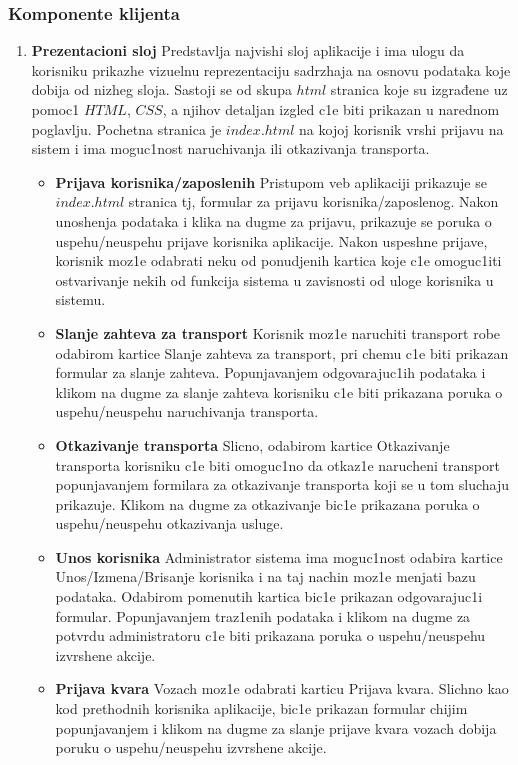 \subsubsection{Komponente klijenta}
\begin{enumerate}
    \item \textbf{Prezentacioni sloj}
    Predstavlja najvishi sloj aplikacije i ima ulogu da korisniku
prikazhe vizuelnu reprezentaciju sadrzhaja na osnovu podataka koje dobija od nizheg
sloja. Sastoji se od skupa $html$ stranica koje su izgrađene uz pomoc1 $HTML$, $CSS$, a njihov detaljan izgled c1e biti prikazan u narednom poglavlju. Pochetna stranica je $index.html$ na kojoj korisnik vrshi prijavu na sistem i ima moguc1nost naruchivanja ili otkazivanja transporta. \\
\begin{itemize}
\item{\textbf{Prijava korisnika/zaposlenih}
Pristupom veb aplikaciji prikazuje se $index.html$ stranica tj, formular za prijavu korisnika/zaposlenog. Nakon unoshenja podataka i klika na dugme za prijavu, prikazuje se poruka o uspehu/neuspehu prijave korisnika aplikacije. Nakon uspeshne prijave, korisnik moz1e odabrati neku od ponudjenih kartica koje c1e omoguc1iti ostvarivanje nekih od funkcija sistema u zavisnosti od uloge korisnika u sistemu.}
\item{\textbf{Slanje zahteva za transport}
Korisnik moz1e naruchiti transport robe odabirom kartice Slanje zahteva za transport, pri chemu c1e biti prikazan formular za slanje zahteva. Popunjavanjem odgovarajuc1ih podataka i klikom na dugme za slanje zahteva korisniku c1e biti prikazana poruka o uspehu/neuspehu naruchivanja transporta.}
\item{\textbf{Otkazivanje transporta}
Slicno, odabirom kartice Otkazivanje transporta korisniku c1e biti omoguc1no da otkaz1e narucheni transport popunjavanjem formilara za otkazivanje transporta koji se u tom sluchaju prikazuje. Klikom na dugme za otkazivanje bic1e prikazana poruka o uspehu/neuspehu otkazivanja usluge.}
\item{\textbf{Unos korisnika}
Administrator sistema ima moguc1nost odabira kartice Unos/Izmena/Brisanje korisnika i na taj nachin moz1e menjati bazu podataka. Odabirom pomenutih kartica bic1e prikazan odgovarajuc1i formular. Popunjavanjem traz1enih podataka i klikom na dugme za potvrdu administratoru c1e biti prikazana poruka o uspehu/neuspehu izvrshene akcije.}
\item{\textbf{Prijava kvara}
Vozach moz1e odabrati karticu Prijava kvara. Slichno kao kod prethodnih korisnika aplikacije, bic1e prikazan formular chijim popunjavanjem i klikom na dugme za slanje prijave kvara vozach dobija poruku o uspehu/neuspehu izvrshene akcije.}


\end{itemize}
\end{enumerate}
